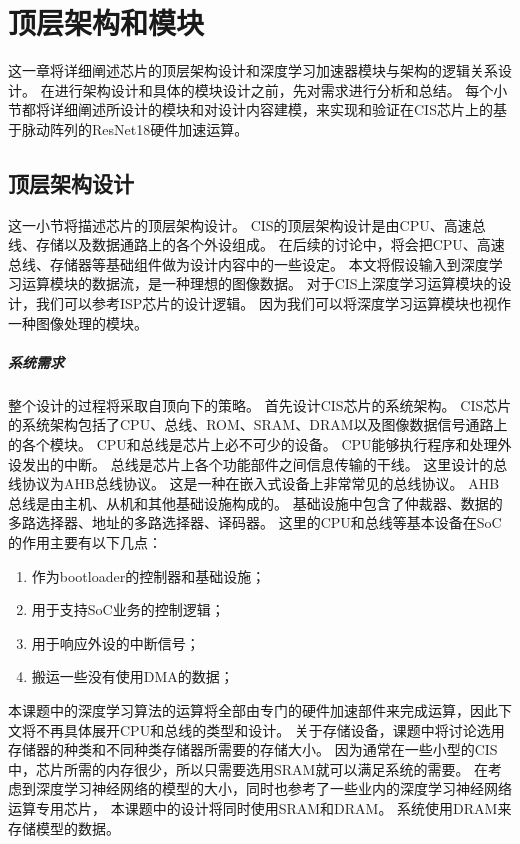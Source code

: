 
\chapter{顶层架构和模块}
这一章将详细阐述芯片的顶层架构设计和深度学习加速器模块与架构的逻辑关系设计。
在进行架构设计和具体的模块设计之前，先对需求进行分析和总结。
每个小节都将详细阐述所设计的模块和对设计内容建模，来实现和验证在CIS芯片上的基于脉动阵列的ResNet18硬件加速运算。


\section{顶层架构设计}
这一小节将描述芯片的顶层架构设计。
CIS的顶层架构设计是由CPU、高速总线、存储以及数据通路上的各个外设组成。
在后续的讨论中，将会把CPU、高速总线、存储器等基础组件做为设计内容中的一些设定。
本文将假设输入到深度学习运算模块的数据流，是一种理想的图像数据。
对于CIS上深度学习运算模块的设计，我们可以参考ISP芯片的设计逻辑。
因为我们可以将深度学习运算模块也视作一种图像处理的模块。  

\paragraph{系统需求}
整个设计的过程将采取自顶向下的策略。
首先设计CIS芯片的系统架构。
CIS芯片的系统架构包括了CPU、总线、ROM、SRAM、DRAM以及图像数据信号通路上的各个模块。
CPU和总线是芯片上必不可少的设备。
CPU能够执行程序和处理外设发出的中断。
总线是芯片上各个功能部件之间信息传输的干线。
这里设计的总线协议为AHB总线协议。
这是一种在嵌入式设备上非常常见的总线协议。
AHB总线是由主机、从机和其他基础设施构成的。
基础设施中包含了仲裁器、数据的多路选择器、地址的多路选择器、译码器。
这里的CPU和总线等基本设备在SoC的作用主要有以下几点：
\begin{enumerate}
    \item 作为bootloader的控制器和基础设施；
    \item 用于支持SoC业务的控制逻辑；
    \item 用于响应外设的中断信号；
    \item 搬运一些没有使用DMA的数据；
\end{enumerate}    

本课题中的深度学习算法的运算将全部由专门的硬件加速部件来完成运算，因此下文将不再具体展开CPU和总线的类型和设计。
关于存储设备，课题中将讨论选用存储器的种类和不同种类存储器所需要的存储大小。
因为通常在一些小型的CIS中，芯片所需的内存很少，所以只需要选用SRAM就可以满足系统的需要。
在考虑到深度学习神经网络的模型的大小，同时也参考了一些业内的深度学习神经网络运算专用芯片，
本课题中的设计将同时使用SRAM和DRAM。
系统使用DRAM来存储模型的数据。



